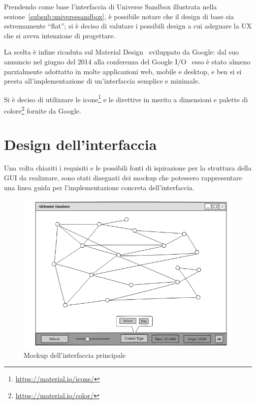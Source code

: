             Prendendo come base l'interfaccia di Universe Sandbox illustrata nella sezione~\ref{subsub:universesandbox}, è possibile notare che il design di base sia estremamente ``flat''; si è deciso di valutare i possibili design a cui adeguare la UX che si aveva intenzione di progettare.

            La scelta è infine ricaduta sul Material Design~\cite{material} sviluppato da Google: dal suo annuncio nel giugno del 2014 alla conferenza del Google I/O~\cite{pichai2014google} esso è stato almeno parzialmente adottatto in molte applicazioni web, mobile e desktop, e ben si si presta all'implementazione di un'interfaccia semplice e minimale.

            Si è deciso di utilizzare le icone\footnote{\url{https://material.io/icons/}} e le direttive in merito a dimensioni e palette di colore\footnote{\url{https://material.io/color/}} fornite da Google.

    \section{Design dell'interfaccia}\label{sec:design}
        Una volta chiariti i requisiti e le possibili fonti di ispirazione per la struttura della GUI da realizzare, sono stati disegnati dei mockup che potessero rappresentare una linea guida per l'implementazione concreta dell'interfaccia.

        \begin{figure}[htbp]
            \centering
            \includegraphics[scale=0.4]{img/withNodes/main_window}
            \caption{Mockup dell'interfaccia principale}
            \label{fig:mock:mainWindow}
        \end{figure}

